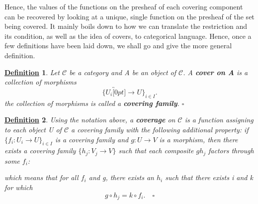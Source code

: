 \documentclass{article}
\newtheorem*{def*}{\underline{Definition}}
\begin{document}
Hence, the values of the functions on the presheaf of each covering component can be recovered by looking at a unique, single function on the presheaf of the set being covered. It mainly boils down to how we can translate the restriction and its condition, as well as the idea of covers, to categorical language. Hence, once a few definitions have been laid down, we shall go and give the more general definition.
\begin{def*}
	Let \(\mathcal{C}\) be a category and A be an object of \(\mathcal{C}\). A \textbf{cover on A} is a collection of morphisms
	\[
		\{U_{i}\overbracket[0pt]{\rightarrow}^{}U\}_{i\in I}.
	\]
	the collection of morphisms is called a \textbf{covering family}. \(\square\)
\end{def*}
\begin{def*}
	Using the notation above, a \textbf{coverage} on \(\mathcal{C}\) is a function assigning to each object U of \(\mathcal{C}\) a covering family with the following additional property: if \(\{f_{i}:U_{i}\rightarrow U\}_{i\in I}\) is a covering family and \(g:U\rightarrow V\) is a morphism, then there exists a covering family \(\{h_{j}:V_{j}\rightarrow V\}\) such that each composite \(gh_{j}\) factors through some \(f_{i}\):
	\begin{center}
	\end{center}
	which means that for all \(f_{i}\) and g, there exists an \(h_{i}\) such that there exists i and k for which
	\[
		g\circ h_{j} = k\circ f_{i}. \quad \square
	\]
\end{def*}
\end{document}
